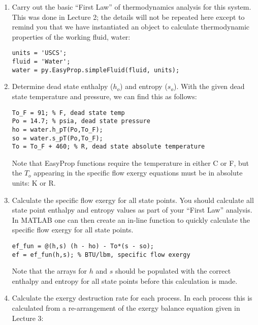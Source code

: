 \begin{enumerate}
\item Carry out the basic ``First Law'' of thermodynamics analysis for this system.  This was done in Lecture 2; the details will not be repeated here except to remind you that we have instantiated an object to calculate thermodynamic properties of the working fluid, water:

\begin{lstlisting}[caption=Construct a \emph{simpleFluid} object]
units = 'USCS';
fluid = 'Water';
water = py.EasyProp.simpleFluid(fluid, units);
\end{lstlisting}

\item Determine dead state enthalpy ($h_o$) and entropy ($s_o$).  With the given dead state temperature and pressure, we can find this as follows:
\begin{lstlisting}[caption=Find dead state enthalpy and entropy]
To_F = 91; % F, dead state temp
Po = 14.7; % psia, dead state pressure
ho = water.h_pT(Po,To_F);
so = water.s_pT(Po,To_F);
To = To_F + 460; % R, dead state absolute temperature
\end{lstlisting}
Note that EasyProp functions require the temperature in either C or F, but the $T_o$ appearing in the specific flow exergy equations must be in absolute units: K or R.

\item Calculate the specific flow exergy for all state points.  You should calculate all state point enthalpy and entropy values as part of your ``First Law'' analysis.  In MATLAB one can then create an in-line function to quickly calculate the specific flow exergy for all state points.

\begin{lstlisting}[caption=Compute specific flow exergy for all state points]
ef_fun = @(h,s) (h - ho) - To*(s - so);
ef = ef_fun(h,s); % BTU/lbm, specific flow exergy 
\end{lstlisting}
Note that the arrays for $h$ and $s$ should be populated with the correct enthalpy and entropy for all state points before this calculation is made.
\item Calculate the exergy destruction rate for each process.  In each process this is calculated from a re-arrangement of the exergy balance equation given in Lecture 3:


\end{enumerate}
